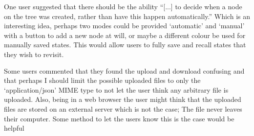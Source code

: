 One user suggested that there should be the ability ``[...] to decide when a
node on the tree was created, rather than have this happen automatically.''
Which is an interesting idea, perhaps two modes could be provided `automatic'
and `manual' with a button to add a new node at will, or maybe a different
colour be used for manually saved states. This would allow users to fully
save and recall states that they wish to revisit.

Some users commented that they found the upload and download confusing and that
perhaps I should limit the possible uploaded files to only the
`application/json' MIME type to not let the user think any arbitrary file
is uploaded. Also, being in a web browser the user might think that the
uploaded files are stored on an external server which is not the case; The file
never leaves their computer. Some method to let the users know this is the case
would be helpful

